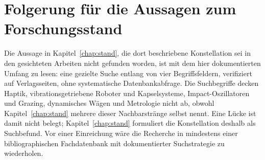\documentclass[12pt,a4paper]{report}
\begin{document}
\section{Folgerung für die Aussagen zum Forschungsstand}

Die Aussage in Kapitel~\ref{chap:stand}, die dort beschriebene
Konstellation sei in den gesichteten Arbeiten nicht gefunden worden, ist
mit dem hier dokumentierten Umfang zu lesen: eine gezielte Suche entlang von vier
Begriffsfeldern, verifiziert auf Verlagsseiten, ohne systematische
Datenbankabfrage. Die Suchbegriffe decken Haptik, vibrationsgetriebene
Roboter und Kapselsysteme, Impact-Oszillatoren und Grazing, dynamisches
Wägen und Metrologie nicht ab, obwohl Kapitel~\ref{chap:stand} mehrere
dieser Nachbarstränge selbst nennt. Eine Lücke ist damit nicht
belegt; Kapitel~\ref{chap:stand} formuliert die Konstellation deshalb als
Suchbefund. Vor einer Einreichung wäre die Recherche in mindestens einer
bibliographischen Fachdatenbank mit dokumentierter Suchstrategie zu
wiederholen.





\end{document}
